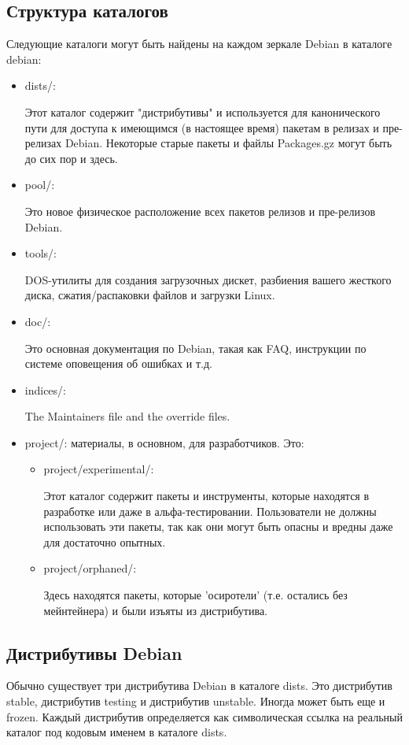 \documentclass[12pt,a4paper]{article}
\begin{document}
\subsection{Структура каталогов}
Следующие каталоги могут быть найдены на каждом зеркале Debian в каталоге debian:
\begin{itemize}
  \item dists/:

 Этот каталог содержит "дистрибутивы" и используется для канонического пути для доступа к имеющимся (в настоящее время) пакетам в релизах и пре-релизах Debian. Некоторые старые пакеты и файлы Packages.gz могут быть до сих пор и здесь.
  
  \item pool/:
  
  Это новое физическое расположение всех пакетов релизов и пре-релизов Debian.
  \item tools/:
  
  DOS-утилиты для создания загрузочных дискет, разбиения вашего жесткого диска, сжатия/распаковки файлов и загрузки Linux.
  \item doc/:
  
  Это основная документация по Debian, такая как FAQ, инструкции по системе оповещения об ошибках и т.д.
  \item indices/:
  
  The Maintainers file and the override files.
  
  \item project/: материалы, в основном, для разработчиков. Это:
      \begin{itemize}
        \item project/experimental/:
        
        Этот каталог содержит пакеты и инструменты, которые находятся в разработке или даже в альфа-тестировании. Пользователи не должны использовать эти пакеты, так как они могут быть опасны и вредны даже для достаточно опытных.
        \item project/orphaned/:
        
        Здесь находятся пакеты, которые 'осиротели' (т.е. остались без мейнтейнера) и были изъяты из дистрибутива.
      \end{itemize}
\end{itemize}
\subsection{Дистрибутивы Debian}
Обычно существует три дистрибутива Debian в каталоге dists. Это дистрибутив stable, дистрибутив testing и дистрибутив unstable. Иногда может быть еще и frozen. Каждый дистрибутив определяется как символическая ссылка на реальный каталог под кодовым именем в каталоге dists. 
\end{document}
